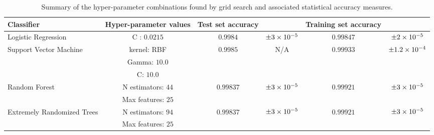 \begin{table}
    \centering
    \begin{tabular}{l c c c c c}
        Classifier                                  & Hyper-parameter values    & Test set accuracy         &                               & Training set accuracy         &  \\
        \hline
        Logistic Regression                         & C : $0.0215$              & $0.9984$                  & $\pm 3\times 10^{-5}$                 & $0.99847$                     & $\pm 2\times 10^{-5}$ \\
        \multirow{3}{*}{Support Vector Machine}     & kernel: RBF               & \multirow{3}{*}{$0.9985$} & \multirow{3}{*}{N/A}          & \multirow{3}{*}{$0.99933$}    & \multirow{3}{*}{$\pm 1.2\times 10^{-4}$} \\
                                                    & Gamma: $10.0$             &                           &                               &                               &       \\
                                                    & C: $10.0$                 &                           &                               &                               &       \\
        \multirow{2}{*}{Random Forest}              & N estimators: $44$        & \multirow{2}{*}{$0.99837$} & \multirow{2}{*}{$\pm 3\times 10^{-5}$} & \multirow{2}{*}{$0.99921$}   & \multirow{2}{*}{$\pm 3\times 10^{-5}$} \\
                                                    & Max features: $25$        &                           &                               &                               &       \\
        \multirow{2}{*}{Extremely Randomized Trees} & N estimators: $94$        & \multirow{2}{*}{$0.99837$} & \multirow{2}{*}{$\pm 3\times 10^{-5}$} & \multirow{2}{*}{$0.99921$}   & \multirow{2}{*}{$\pm 3\times 10^{-5}$} \\
                                                    & Max features: $25$        &                           &                               &                               &       \\
    \end{tabular}
    \caption{Summary of the hyper-parameter combinations found by grid search and associated statistical accuracy measures.}
    \label{tab:gridresults}
\end{table}

